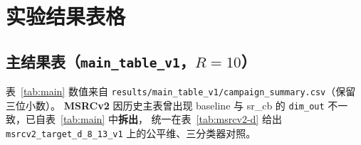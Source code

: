 \documentclass[11pt,a4paper]{article}
\begin{document}
\section{实验结果表格}

\subsection{主结果表（\texttt{main\_table\_v1}，$R{=}10$）}
表~\ref{tab:main} 数值来自 \texttt{results/main\_table\_v1/campaign\_summary.csv}（保留三位小数）。
\textbf{MSRCv2} 因历史主表曾出现 baseline 与 sr\_cb 的 \texttt{dim\_out} 不一致，已自表~\ref{tab:main} 中\textbf{拆出}，
统一在表~\ref{tab:msrcv2-d} 给出 \texttt{msrcv2\_target\_d\_8\_13\_v1} 上的公平维、三分类器对照。
\end{document}
